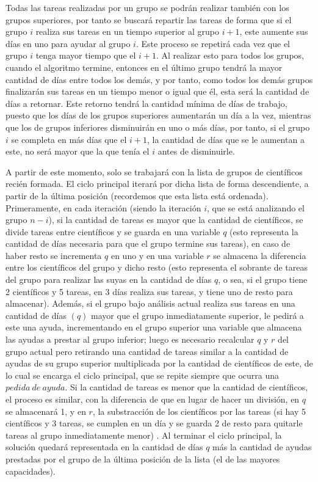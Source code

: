 \documentclass[10pt,letterpaper]{article}
\begin{document}
{ 	Todas las tareas realizadas por un grupo se podr\'an realizar tambi\'en con los grupos superiores, por tanto se buscar\'a repartir las tareas de forma que si el grupo $i$ realiza sus tareas en un tiempo superior al grupo $i + 1$, este aumente sus d\'ias en  uno para ayudar al grupo $i$. Este proceso se repetir\'a cada vez que el grupo $i$ tenga mayor tiempo que el $i + 1$. Al realizar esto para todos los grupos, cuando el algoritmo termine, entonces en el \'ultimo grupo tendr\'a la mayor cantidad de d\'ias entre todos los dem\'as, y por tanto, como todos los dem\'as grupos finalizar\'an sus tareas en un tiempo menor o igual que \'el, esta ser\'a la cantidad de d\'ias a retornar. Este retorno tendr\'a la cantidad m\'inima de d\'ias de trabajo, puesto que los d\'ias de los grupos superiores aumentar\'an un d\'ia a la vez, mientras que los de grupos inferiores disminuir\'an en uno o m\'as d\'ias, por tanto, si el grupo $i$ se completa en m\'as d\'ias que el $i + 1$, la cantidad de d\'ias que se le aumentan a este, no ser\'a mayor que la que ten\'ia el $i$ antes de disminuirle.
 	
 	A partir de este momento, solo se trabajar\'a con la lista de grupos de cient\'ificos reci\'en formada. El ciclo principal iterar\'a por dicha lista de forma descendiente, a partir de la \'ultima posici\'on (recordemos que esta lista est\'a ordenada). Primeramente, en cada iteraci\'on (siendo la iteraci\'on $i$, que se est\'a analizando el grupo $n - i$), si la cantidad de tareas es mayor que la cantidad de cient\'ificos, se divide tareas entre cient\'ificos y se guarda en una variable $q$ (esto representa la cantidad de d\'ias necesaria para que el grupo termine sus tareas), en caso de haber resto se incrementa $q$ en uno y en una variable $r$ se almacena la diferencia entre los cient\'ificos del grupo y dicho resto (esto representa el sobrante de tareas del grupo para realizar las suyas en la cantidad de d\'ias $q$, o sea, si el grupo tiene 2 cient\'ificos y 5 tareas, en 3 d\'ias realiza sus tareas, y tiene uno de resto para almacenar). Adem\'as, si el grupo bajo an\'alisis actual realiza sus tareas en una cantidad de d\'ias $(q)$ mayor que el grupo inmediatamente superior, le pedir\'a a este una ayuda, incrementando en el grupo superior una variable que almacena las ayudas a prestar al grupo inferior; luego es necesario recalcular $q$ y $r$ del grupo actual pero retirando una cantidad de tareas similar a la cantidad de ayudas de su grupo superior multiplicada por la cantidad de cient\'ificos de este, de lo cual se encarga el ciclo principal, que se repite siempre que ocurra una $pedida \ de \ ayuda$. Si la cantidad de tareas es menor que la cantidad de cient\'ificos, el proceso es similar, con la diferencia de que en lugar de hacer un divisi\'on, en $q$ se almacenar\'a 1, y en $r$, la substracci\'on de los cient\'ificos por las tareas (si hay 5 cient\'ificos y 3 tareas, se cumplen en un d\'ia y se guarda 2 de resto para quitarle tareas al grupo inmediatamente menor) . Al terminar el ciclo principal, la soluci\'on quedar\'a representada en la cantidad de d\'ias $q$ m\'as la cantidad de ayudas prestadas por el grupo de la \'ultima posici\'on de la lista (el de las mayores capacidades).\\ \\
 	
}
\end{document}
